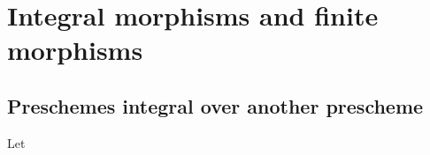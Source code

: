 \section{Integral morphisms and finite morphisms}
\label{section:II.6}


\subsection{Preschemes integral over another prescheme}
\label{subsection:II.6.1}

\begin{definition}[6.1.1]
\label{II.6.1.1}
Let
\end{definition}












